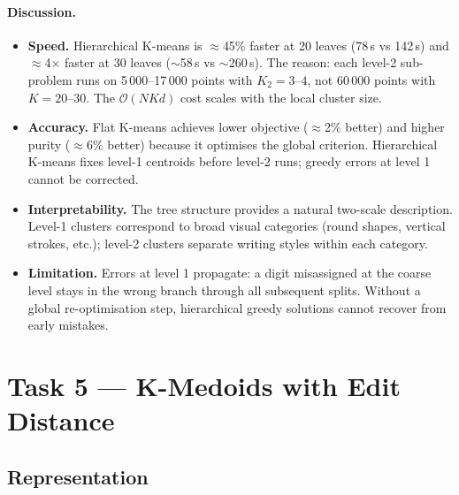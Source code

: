 \documentclass[11pt]{article}
\begin{document}
\paragraph{Discussion.}

\begin{itemize}[itemsep=3pt]
    \item \textbf{Speed.}
          Hierarchical K-means is $\approx$45\% faster at 20 leaves (78\,s vs 142\,s)
          and $\approx$4$\times$ faster at 30 leaves ($\sim$58\,s vs $\sim$260\,s).
          The reason: each level-2 sub-problem runs on 5\,000--17\,000 points
          with $K_2{=}3\text{--}4$, not 60\,000 points with $K{=}20\text{--}30$.
          The $\mathcal{O}(NKd)$ cost scales with the local cluster size.

    \item \textbf{Accuracy.}
          Flat K-means achieves lower objective ($\approx$2\% better) and higher
          purity ($\approx$6\% better) because it optimises the global criterion.
          Hierarchical K-means fixes level-1 centroids before level-2 runs;
          greedy errors at level 1 cannot be corrected.

    \item \textbf{Interpretability.}
          The tree structure provides a natural two-scale description.
          Level-1 clusters correspond to broad visual categories (round shapes,
          vertical strokes, etc.); level-2 clusters separate writing styles
          within each category.

    \item \textbf{Limitation.}
          Errors at level 1 propagate: a digit misassigned at the coarse
          level stays in the wrong branch through all subsequent splits.
          Without a global re-optimisation step, hierarchical greedy solutions
          cannot recover from early mistakes.
\end{itemize}

\section{Task 5 — K-Medoids with Edit Distance}

\subsection{Representation}
\end{document}
